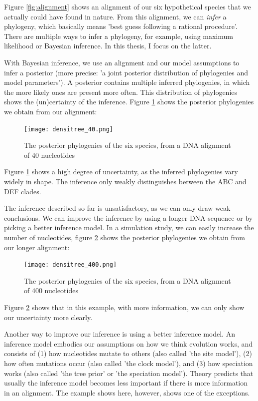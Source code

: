 Figure \ref{fig:alignment} shows an alignment of our six hypothetical species
that we actually could have found in nature. From this alignment, we
can \emph{infer} a phylogeny, which basically means 'best guess following a 
rational procedure'. There are multiple ways to infer a phylogeny, for
example, using maximum likelihood or Bayesian inference. In this thesis, 
I focus on the latter.

With Bayesian inference, we use an alignment and our model assumptions to infer 
a posterior (more 
precise: 'a joint posterior distribution of phylogenies and model parameters').
A posterior contains multiple inferred phylogenies, in which the more likely
ones are present more often. This distribution of phylogenies shows the
(un)certainty of the inference. Figure \ref{fig:densitree} shows the
posterior phylogenies we obtain from our alignment:

\begin{figure}[H]
  \texttt{[image: densitree\_40.png]}
  \caption{
    The posterior phylogenies of the six species, 
    from a DNA alignment of 40 nucleotides
  }
  \label{fig:densitree}
\end{figure}

Figure \ref{fig:densitree} shows a high degree of uncertainty, as the
inferred phylogenies vary widely in shape. The inference only
weakly distinguishes between the ABC and DEF clades. 

The inference described so far is unsatisfactory, as we can only draw 
weak conclusions. We can improve the inference by using a longer DNA sequence 
or by picking a better inference model. In a simulation study, we can
easily increase the number of nucleotides, 
figure \ref{fig:densitree_again} shows the
posterior phylogenies we obtain from our longer alignment:

\begin{figure}[H]
  \texttt{[image: densitree\_400.png]}
  \caption{
    The posterior phylogenies of the six species,
    from a DNA alignment of 400 nucleotides
  }
  \label{fig:densitree_again}
\end{figure}

Figure \ref{fig:densitree_again} shows that in this example,
with more information, we can only show our uncertainty more clearly. 

Another way to improve our inference is using a better inference model.
An inference model embodies our assumptions on how we think evolution
works, and consists of (1) how nucleotides mutate to others (also
called 'the site model'), (2) how often mutations occur (also 
called 'the clock model'), and (3) how speciation works (also 
called 'the tree prior' or 'the speciation model'). 
Theory predicts that usually the inference model becomes less important
if there is more information in an alignment. The example shows here,
however, shows one of the exceptions.

